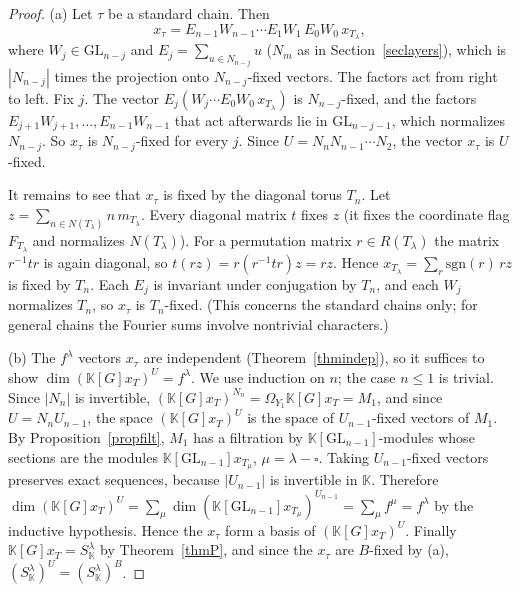 \documentclass[11pt, letterpaper]{amsart}
\theoremstyle{definition}
\theoremstyle{remark}
\newcommand{\KK}{\mathbb{K}}
\newcommand{\GL}{\mathrm{GL}}
\newcommand{\sgn}{\mathrm{sgn}}
\begin{document}
\begin{proof}
(a) Let $\tau$ be a standard chain. Then
\[
x_\tau=E_{n-1}W_{n-1}\cdots E_1W_1\,E_0W_0\,x_{T_\lambda},
\]
where $W_j\in\GL_{n-j}$ and $E_j=\sum_{u\in N_{n-j}}u$ ($N_m$ as in Section~\ref{seclayers}), which is $|N_{n-j}|$ times the projection onto $N_{n-j}$-fixed vectors. The factors act from right to left. Fix $j$. The vector $E_j(W_j\cdots E_0W_0\,x_{T_\lambda})$ is $N_{n-j}$-fixed, and the factors $E_{j+1}W_{j+1},\dots,E_{n-1}W_{n-1}$ that act afterwards lie in $\GL_{n-j-1}$, which normalizes $N_{n-j}$. So $x_\tau$ is $N_{n-j}$-fixed for every $j$. Since $U=N_nN_{n-1}\cdots N_2$, the vector $x_\tau$ is $U$-fixed.

It remains to see that $x_\tau$ is fixed by the diagonal torus $T_n$. Let $z=\sum_{n\in N(T_\lambda)}n\,m_{T_\lambda}$. Every diagonal matrix $t$ fixes $z$ (it fixes the coordinate flag $F_{T_\lambda}$ and normalizes $N(T_\lambda)$). For a permutation matrix $r\in R(T_\lambda)$ the matrix $r^{-1}tr$ is again diagonal, so $t(rz)=r(r^{-1}tr)z=rz$. Hence $x_{T_\lambda}=\sum_r\sgn(r)\,rz$ is fixed by $T_n$. Each $E_j$ is invariant under conjugation by $T_n$, and each $W_j$ normalizes $T_n$, so $x_\tau$ is $T_n$-fixed. (This concerns the standard chains only; for general chains the Fourier sums involve nontrivial characters.)

(b) The $f^\lambda$ vectors $x_\tau$ are independent (Theorem~\ref{thmindep}), so it suffices to show $\dim(\KK[G]x_T)^U=f^\lambda$. We use induction on $n$; the case $n\le1$ is trivial. Since $|N_n|$ is invertible, $(\KK[G]x_T)^{N_n}=\Omega_{Y_1}\KK[G]x_T=M_1$, and since $U=N_nU_{n-1}$, the space $(\KK[G]x_T)^U$ is the space of $U_{n-1}$-fixed vectors of $M_1$. By Proposition~\ref{propfilt}, $M_1$ has a filtration by $\KK[\GL_{n-1}]$-modules whose sections are the modules $\KK[\GL_{n-1}]x_{T_\mu}$, $\mu=\lambda-\square$. Taking $U_{n-1}$-fixed vectors preserves exact sequences, because $|U_{n-1}|$ is invertible in $\KK$. Therefore $\dim(\KK[G]x_T)^U=\sum_\mu\dim(\KK[\GL_{n-1}]x_{T_\mu})^{U_{n-1}}=\sum_\mu f^\mu=f^\lambda$ by the inductive hypothesis. Hence the $x_\tau$ form a basis of $(\KK[G]x_T)^U$. Finally $\KK[G]x_T=S^\lambda_\KK$ by Theorem~\ref{thmP}, and since the $x_\tau$ are $B$-fixed by (a), $(S^\lambda_\KK)^U=(S^\lambda_\KK)^B$.
\end{proof}
\end{document}

